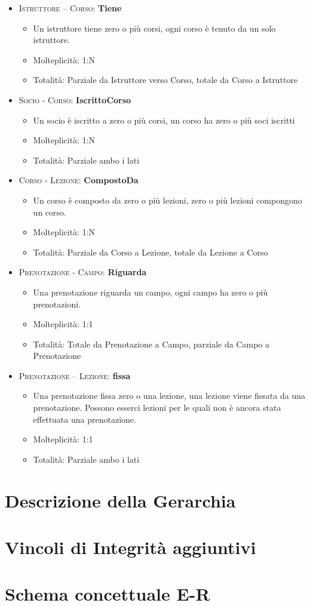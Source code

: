 \begin{itemize}
\item \textsc{Istruttore – Corso:} \textbf{Tiene}
\begin{itemize}
\item Un istruttore tiene zero o più corsi, ogni corso è tenuto da un solo istruttore.
\item Molteplicità: 1:N
\item Totalità: Parziale da Istruttore verso Corso, totale da Corso a Istruttore
\end{itemize}
\item \textsc{Socio - Corso:} \textbf{IscrittoCorso}
\begin{itemize}
\item Un socio è iscritto a zero o più corsi, un corso ha zero o più soci iscritti
\item Molteplicità: 1:N
\item Totalità: Parziale ambo i lati
\end{itemize}
\item \textsc{Corso - Lezione:} \textbf{CompostoDa}
\begin{itemize}
\item Un corso è composto da zero o più lezioni, zero o più lezioni compongono un corso.
\item Molteplicità: 1:N
\item Totalità: Parziale da Corso a Lezione, totale da Lezione a Corso
\end{itemize}
\item \textsc{Prenotazione - Campo:} \textbf{Riguarda}
\begin{itemize}
\item Una prenotazione riguarda un campo, ogni campo ha zero o più prenotazioni.
\item Molteplicità: 1:1
\item Totalità: Totale da Prenotazione a Campo, parziale da Campo a Prenotazione 
\end{itemize}
\item \textsc{Prenotazione – Lezione:} \textbf{fissa}
\begin{itemize}
\item Una prenotazione fissa zero o una lezione, una lezione viene fissata da una prenotazione. Possono esserci lezioni per le quali non è ancora stata effettuata una prenotazione.
\item Molteplicità: 1:1
\item Totalità: Parziale ambo i lati
\end{itemize}
\end{itemize}


\section{Descrizione della Gerarchia}
\section{Vincoli di Integrità aggiuntivi}
\section{Schema concettuale E-R}